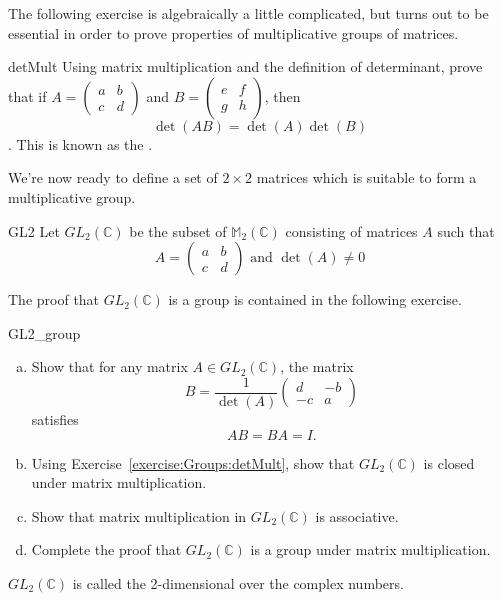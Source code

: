 The following exercise is algebraically a little complicated, but turns out to be essential in order to prove properties of multiplicative groups of matrices.  

\begin{exercise}{detMult}
  Using matrix multiplication and the definition of determinant, prove that if $A =
\begin{pmatrix}
a & b \\
c & d
\end{pmatrix}$ and $B =
\begin{pmatrix}
e & f \\
g & h
\end{pmatrix}$,
then 
$$\det(AB) =  \det(A)\det(B)$$.
This is known as the .
\end{exercise}

We're now ready to define a set of $2\times 2$ matrices which is suitable to form a multiplicative group.

\begin{defn}{GL2}
Let $GL_2({\mathbb C})$ be the subset of ${\mathbb M}_2 ( {\mathbb C})$ consisting of matrices $A$ such that
\[
A =
\begin{pmatrix}
a & b \\
c & d
\end{pmatrix} \text{ and } \det(A) \neq 0
\]
\end{defn}

The proof that $GL_2({\mathbb C})$ is a group is contained in the following exercise.

\begin{exercise}{GL2_group}
\begin{enumerate}[(a)]
\item
Show that for any matrix $A \in GL_2(\mathbb{C})$, the matrix
\[
B =
\frac{1}{\det(A)}\begin{pmatrix}
d & -b \\
-c & a
\end{pmatrix} 
\]
 satisfies
\[ AB = BA = I.\]
\item
Using  Exercise~\ref{exercise:Groups:detMult}, show that $GL_2(\mathbb{C})$ is closed under matrix multiplication.
\item
Show that  matrix multiplication in $GL_2(\mathbb{C})$ is associative.
\item
Complete the proof that $GL_2(\mathbb{C})$ is a group under matrix multiplication.
\end{enumerate}

$GL_2(\mathbb C)$ is called the 2-dimensional  over the complex numbers.
\end{exercise}

